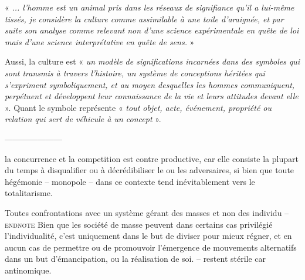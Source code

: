 \documentclass{article}
\begin{document}
 « \textit{... l’homme est un animal pris dans les réseaux de signifiance qu’il a lui-même tissés, je considère la culture comme assimilable à une toile d’araignée, et par suite son analyse comme relevant non d’une science expérimentale en quête de loi mais d’une science interprétative en quête de sens.} »

Aussi, la culture est « \textit{un modèle de significations incarnées dans des symboles qui sont transmis à travers l'histoire, un système de conceptions héritées qui s'expriment symboliquement, et au moyen desquelles les hommes communiquent, perpétuent et développent leur connaissance de la vie et leurs attitudes devant elle} ». Quant le symbole représente « \textit{tout objet, acte, événement, propriété ou relation qui sert de véhicule à un concept} ».


%
\bigskip
---------------------
\bigskip

la concurrence et la competition est contre productive, car elle consiste la plupart du temps à disqualifier ou à décrédibiliser le ou les adversaires, si bien que toute hégémonie -- monopole -- dans ce contexte tend inévitablement vers le totalitarisme.

Toutes confrontations avec un système gérant des masses et non des individu -- \textsc{endnote} {Bien que les société de masse peuvent dans certains cas privilégié l'individualité, c'est uniquement dans le but de diviser pour mieux régner, et en aucun cas de permettre ou de promouvoir l'émergence de mouvements alternatifs dans un but d'émancipation, ou la réalisation de soi.}  -- restent stérile car antinomique.

\end{document}
